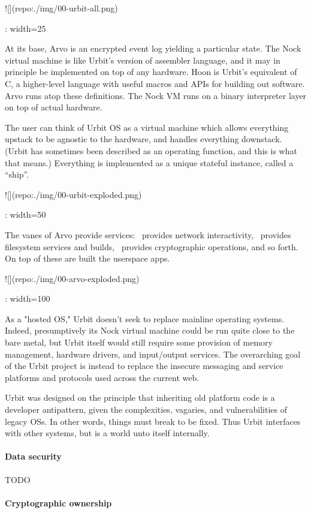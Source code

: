![](repo:./img/00-urbit-all.png){: width=25%

At its base, Arvo is an encrypted event log yielding a particular state.  The Nock virtual machine is like Urbit's version of assembler language, and it may in principle be implemented on top of any hardware.  Hoon is Urbit's equivalent of C, a higher-level language with useful macros and APIs for building out software.  Arvo runs atop these definitions.  The Nock VM runs on a binary interpreter layer on top of actual hardware.

The user can think of Urbit OS as a virtual machine which allows everything upstack to be agnostic to the hardware, and handles everything downstack.  (Urbit has sometimes been described as an operating function, and this is what that means.)  Everything is implemented as a unique stateful instance, called a “ship”.

![](repo:./img/00-urbit-exploded.png){: width=50%

The vanes of Arvo provide services:  \ames~provides network interactivity, \clay~provides filesystem services and builds, \jael~provides cryptographic operations, and so forth.  On top of these are built the userspace apps.

![](repo:./img/00-arvo-exploded.png){: width=100%

As a "hosted OS," Urbit doesn't seek to replace mainline operating systems.  Indeed, presumptively its Nock virtual machine could be run quite close to the bare metal, but Urbit itself would still require some provision of memory management, hardware drivers, and input/output services.  The overarching goal of the Urbit project is instead to replace the insecure messaging and service platforms and protocols used across the current web.

Urbit was designed on the principle that inheriting old platform code is a developer antipattern, given the complexities, vagaries, and vulnerabilities of legacy OSs.  In other words, things must break to be fixed.  Thus Urbit interfaces with other systems, but is a world unto itself internally.

\paragraph{Data security}

TODO

\paragraph{Cryptographic ownership}

}}}
